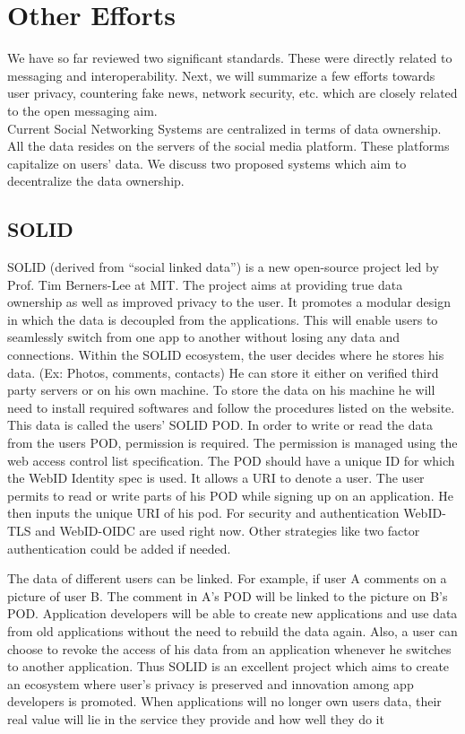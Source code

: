 \documentclass[11pt, conference, a4paper]{IEEEtran}
\begin{document}
\section{Other Efforts}
\label{SEC: other}
We have so far reviewed two significant standards. These were directly related to messaging and interoperability. Next, we will summarize a few efforts towards user privacy, countering fake news, network security, etc. which are closely related to the open messaging aim. \\
Current Social Networking Systems are centralized in terms of data ownership. All the data resides on the servers of the social media platform. These platforms capitalize on users' data. We discuss two proposed systems which aim to decentralize the data ownership.
\subsection{SOLID}
SOLID (derived from “social linked data”) is a new open-source project led by Prof. Tim Berners-Lee at MIT. \cite{SOLID} The project aims at providing true data ownership as well as improved privacy to the user. It promotes a modular design in which the data is decoupled from the applications. This will enable users to seamlessly switch from one app to another without losing any data and connections.  Within the SOLID ecosystem, the user decides where he stores his data. (Ex: Photos, comments, contacts) He can store it either on verified third party servers or on his own machine. To store the data on his machine he will need to install required softwares and follow the procedures listed on the website. This data is called the users' SOLID POD.  In order to write or read the data from the users POD, permission is required. The permission is managed using the web access control list specification. The POD should have a unique ID for which the WebID Identity spec is used. It allows a URI to denote a user. The user permits to read or write parts of his POD while signing up on an application. He then inputs the unique URI of his pod.   For security and authentication WebID-TLS and WebID-OIDC are used right now. Other strategies like two factor authentication could be added if needed.
\par
The data of different users can be linked. For example, if user A comments on a picture of user B. The comment in A’s POD will be linked to the picture on B’s POD. Application developers will be able to create new applications and use data from old applications without the need to rebuild the data again. Also, a user can choose to revoke the access of his data from an application whenever he switches to another application. Thus SOLID is an excellent project which aims to create an ecosystem where user’s privacy is preserved and innovation among app developers is promoted. When applications will no longer own users data, their real value will lie in the service they provide and how well they do it
\end{document}
